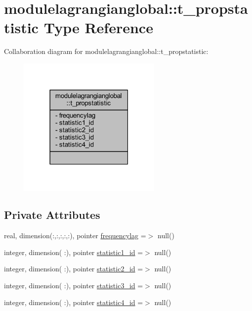 \hypertarget{structmodulelagrangianglobal_1_1t__propstatistic}{}\section{modulelagrangianglobal\+:\+:t\+\_\+propstatistic Type Reference}
\label{structmodulelagrangianglobal_1_1t__propstatistic}


Collaboration diagram for modulelagrangianglobal\+:\+:t\+\_\+propstatistic\+:\nopagebreak
\begin{figure}[H]
\begin{center}
\leavevmode
\includegraphics[width=198pt]{structmodulelagrangianglobal_1_1t__propstatistic__coll__graph}
\end{center}
\end{figure}
\subsection*{Private Attributes}
\begin{DoxyCompactItemize}
\item 
real, dimension(\+:,\+:,\+:,\+:,\+:), pointer \mbox{\hyperlink{structmodulelagrangianglobal_1_1t__propstatistic_a5d05b750b7b03f40da9337315badf23f}{frequencylag}} =$>$ null()
\item 
integer, dimension( \+:), pointer \mbox{\hyperlink{structmodulelagrangianglobal_1_1t__propstatistic_aade76e914f7110734c22dae5c56db9ef}{statistic1\+\_\+id}} =$>$ null()
\item 
integer, dimension( \+:), pointer \mbox{\hyperlink{structmodulelagrangianglobal_1_1t__propstatistic_afa81634fa44cd7e1cb7d3d9a5c4ea449}{statistic2\+\_\+id}} =$>$ null()
\item 
integer, dimension( \+:), pointer \mbox{\hyperlink{structmodulelagrangianglobal_1_1t__propstatistic_a6c626894033f91809b69a5c5a675d9ed}{statistic3\+\_\+id}} =$>$ null()
\item 
integer, dimension( \+:), pointer \mbox{\hyperlink{structmodulelagrangianglobal_1_1t__propstatistic_ab71a971ff3bdca0523c75b17bd74e1bc}{statistic4\+\_\+id}} =$>$ null()
\end{DoxyCompactItemize}


